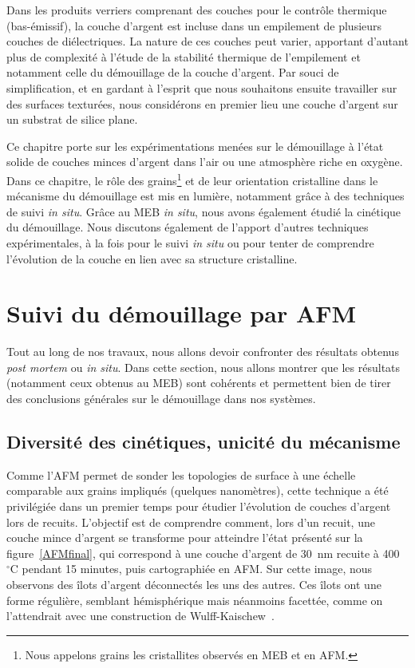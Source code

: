 \minitoc
\newpage

Dans les produits verriers comprenant des couches pour le contrôle thermique (bas-émissif), la couche d'argent est incluse dans un empilement de plusieurs couches de diélectriques. La nature de ces couches peut varier, apportant d'autant plus de complexité à l'étude de la stabilité thermique de l'empilement et notamment celle du démouillage de la couche d'argent. Par souci de simplification, et en gardant à l'esprit que nous souhaitons ensuite travailler sur des surfaces texturées, nous considérons en premier lieu une couche d'argent sur un substrat de silice plane.\par
Ce chapitre porte sur les expérimentations menées sur le démouillage à l'état solide de couches minces d'argent dans l'air ou une atmosphère riche en oxygène. Dans ce chapitre, le rôle des grains\footnote{Nous appelons \og grains \fg{} les cristallites observés en MEB et en AFM.} et de leur orientation cristalline dans le mécanisme du démouillage est mis en lumière, notamment grâce à des techniques de suivi \textit{in situ}. Grâce au MEB \textit{in situ}, nous avons également étudié la cinétique du démouillage. Nous discutons également de l'apport d'autres techniques expérimentales, à la fois pour le suivi \textit{in situ} ou pour tenter de comprendre l'évolution de la couche en lien avec sa structure cristalline.\par 


\section{Suivi du démouillage par AFM}
Tout au long de nos travaux, nous allons devoir confronter des résultats obtenus \textit{post mortem} ou \textit{in situ}. Dans cette section, nous allons montrer que les résultats (notamment ceux obtenus au MEB) sont cohérents et permettent bien de tirer des conclusions générales sur le démouillage dans nos systèmes. 

\subsection{Diversité des cinétiques, unicité du mécanisme}
\label{sPostMortem}
Comme l'AFM permet de sonder les topologies de surface à une échelle comparable aux grains impliqués (quelques nanomètres), cette technique a été privilégiée dans un premier temps pour étudier l'évolution de couches d'argent lors de recuits. L'objectif est de comprendre comment, lors d'un recuit, une couche mince d'argent se transforme pour atteindre l'état présenté sur la figure~\ref{AFMfinal}, qui correspond à une couche d'argent de 30~nm recuite à 400~$^\circ$C pendant 15 minutes, puis cartographiée en AFM. Sur cette image, nous observons des îlots d'argent déconnectés les uns des autres. Ces îlots ont une forme régulière, semblant hémisphérique mais néanmoins facettée, comme on l'attendrait avec une construction de Wulff-Kaischew~\cite{wulff1901xxv, kaischew1951thermodynamique, winterbottom1967equilibrium}.\par 


